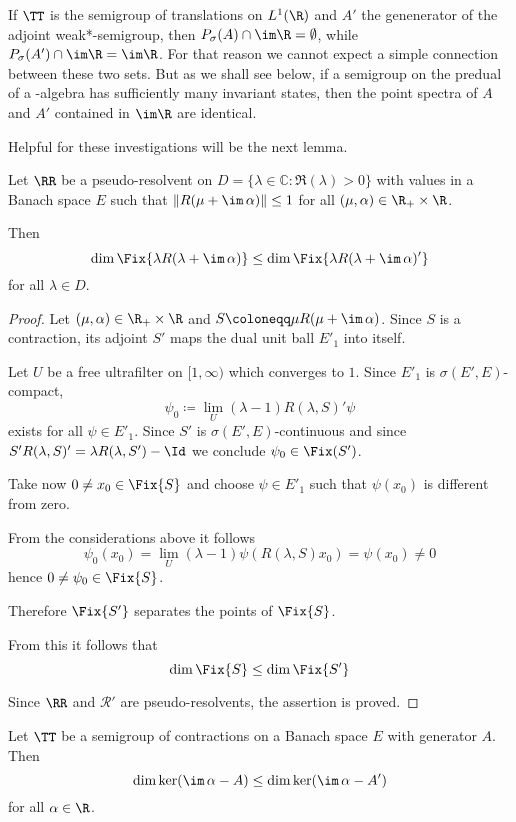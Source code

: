 If $\TT$ is the semigroup of translations on $L^1(\R)$ and $A'$ the genenerator 
of the adjoint weak*-semigroup, then $P_{\sigma}(A) \cap \im\R = \emptyset$, while $P_{\sigma}(A') \cap \im\R = \im\R$.
For that reason we cannot expect a simple connection between these two sets.
But as we shall see below, if a semigroup on the predual of a \WA-algebra has sufficiently many invariant states, then the point spectra of $A$ and $A'$ contained in $\im\R$ are identical.

Helpful for these investigations will be the next lemma.
\begin{lemma}\label{lem:d3-1.6}
Let $\RR$ be a pseudo-resolvent on $D = \{\lambda \in \mathbb{C} \colon \Re(\lambda) > 0\}$ with values in a Banach space $E$ such that $\|R(\mu + \im\,\alpha)\| \leq 1$ for all $(\mu,\alpha) \in \R_{+} \times \R$.

Then
\[
\dim \Fix{\lambda R(\lambda + \im\,\alpha)} \leq \dim \Fix{\lambda R(\lambda + \im\,\alpha)'} 
\]
for all $\lambda \in D$.
\end{lemma}

\begin{proof}
Let $(\mu,\alpha) \in \R_{+} \times \R$ and $S \coloneqq \mu R(\mu + \im\,\alpha)$.
Since $S$ is a contraction, its adjoint $S'$ maps the dual unit ball $E'_{1}$ into itself.

Let $U$ be a free ultrafilter on $[1,\infty)$ which converges to $1$.
Since $E'_{1}$ is $\sigma(E',E)$-compact,
\[
\psi_{0} \coloneqq \lim_{U}(\lambda - 1)R(\lambda,S)'\psi
\]
exists for all $\psi \in E'_{1}$.
Since $S'$ is $\sigma(E',E)$-continuous and since $S'R(\lambda,S)' = \lambda R(\lambda,S')-\Id$ we conclude $\psi_{0} \in \Fix(S')$.

Take now $0 \neq x_{0} \in \Fix{S}$ and choose $\psi \in E'_{1}$ such that $\psi(x_{0})$ is different from zero.

From the considerations above it follows
\[
\psi_{0}(x_{0}) = \lim_{U}(\lambda - 1)\psi(R(\lambda,S)x_{0}) = \psi(x_{0}) \neq 0
\]
hence $0 \neq \psi_{0} \in \Fix{S}$.

Therefore $\Fix{S'}$ separates the points of $\Fix{S}$.

From this it follows that
\[
\dim \Fix{S} \leq \dim \Fix{S'}
\]

Since $\RR$ and $\mathcal{R'}$ are pseudo-resolvents, the assertion is proved.
\end{proof}
\begin{corollary}\label{cor:d3-1.7}
Let $\TT$ be a semigroup of contractions on a Banach space $E$ with generator $A$.
Then
\[
\dim \ker(\im\,\alpha - A) \leq \dim \ker(\im\,\alpha - A')
\]
for all $\alpha \in \R$.
\end{corollary}

